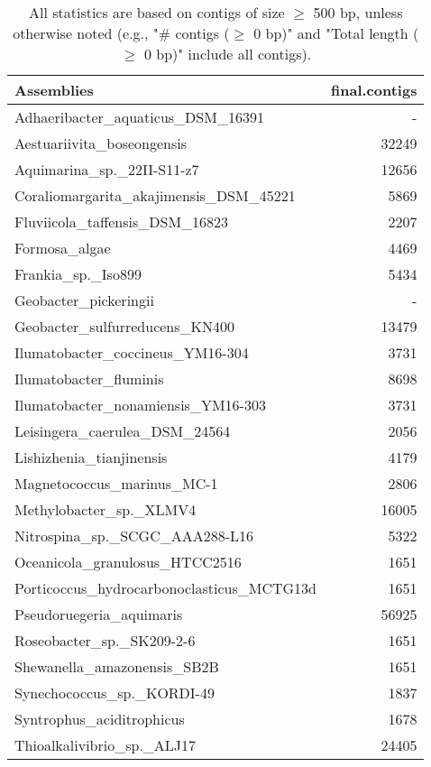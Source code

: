 \documentclass[12pt,a4paper]{article}
\begin{document}
\begin{table}[ht]
\begin{center}
\caption{All statistics are based on contigs of size $\geq$ 500 bp, unless otherwise noted (e.g., "\# contigs ($\geq$ 0 bp)" and "Total length ($\geq$ 0 bp)" include all contigs).}
\begin{tabular}{|l*{1}{|r}|}
\hline
Assemblies & final.contigs \\ \hline
Adhaeribacter\_aquaticus\_DSM\_16391 & - \\ \hline
Aestuariivita\_boseongensis & 32249 \\ \hline
Aquimarina\_sp.\_22II-S11-z7 & 12656 \\ \hline
Coraliomargarita\_akajimensis\_DSM\_45221 & 5869 \\ \hline
Fluviicola\_taffensis\_DSM\_16823 & 2207 \\ \hline
Formosa\_algae & 4469 \\ \hline
Frankia\_sp.\_Iso899 & 5434 \\ \hline
Geobacter\_pickeringii & - \\ \hline
Geobacter\_sulfurreducens\_KN400 & 13479 \\ \hline
Ilumatobacter\_coccineus\_YM16-304 & 3731 \\ \hline
Ilumatobacter\_fluminis & 8698 \\ \hline
Ilumatobacter\_nonamiensis\_YM16-303 & 3731 \\ \hline
Leisingera\_caerulea\_DSM\_24564 & 2056 \\ \hline
Lishizhenia\_tianjinensis & 4179 \\ \hline
Magnetococcus\_marinus\_MC-1 & 2806 \\ \hline
Methylobacter\_sp.\_XLMV4 & 16005 \\ \hline
Nitrospina\_sp.\_SCGC\_AAA288-L16 & 5322 \\ \hline
Oceanicola\_granulosus\_HTCC2516 & 1651 \\ \hline
Porticoccus\_hydrocarbonoclasticus\_MCTG13d & 1651 \\ \hline
Pseudoruegeria\_aquimaris & 56925 \\ \hline
Roseobacter\_sp.\_SK209-2-6 & 1651 \\ \hline
Shewanella\_amazonensis\_SB2B & 1651 \\ \hline
Synechococcus\_sp.\_KORDI-49 & 1837 \\ \hline
Syntrophus\_aciditrophicus & 1678 \\ \hline
Thioalkalivibrio\_sp.\_ALJ17 & 24405 \\ \hline

\end{tabular}
\end{center}
\end{table}
\end{document}
